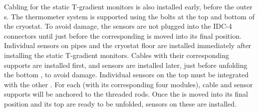 Cabling for the static T-gradient monitors is also installed early, before the outer s.  The thermometer system is supported using the bolts at the top and bottom of the cryostat. To avoid  damage, the  sensors are not plugged into the IDC-4 connectors until just before the corresponding  is moved into its final position. Individual sensors on pipes and the cryostat floor are installed immediately after installing the static T-gradient monitors.  Cables  with their corresponding supports are installed first, and  sensors are installed later, just before unfolding the bottom , to avoid damage. Individual sensors on the top  must be integrated with the other . For each  (with its corresponding four  modules), cable and sensor supports will be anchored to the  threaded rods. Once the  is moved into its final position and its top  are ready to be unfolded, sensors on these  are installed.

